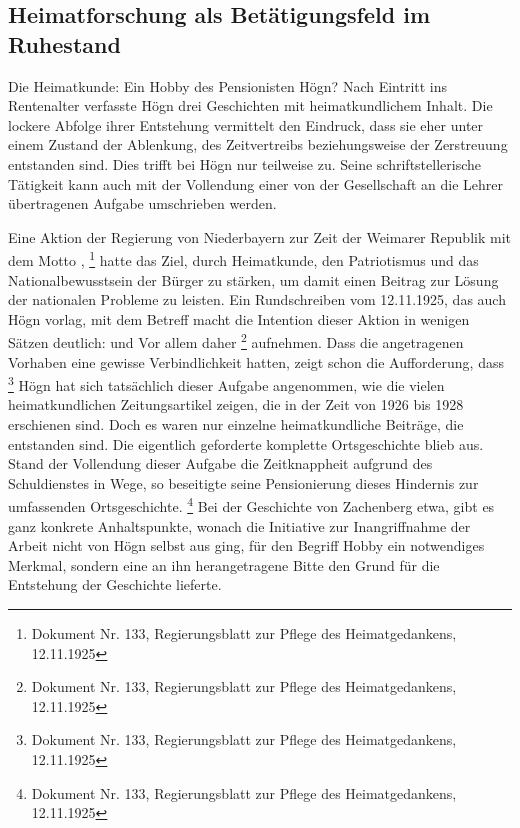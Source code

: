 \subsection{Heimatforschung als Betätigungsfeld im Ruhestand}

Die Heimatkunde: Ein Hobby des
Pensionisten Högn? Nach Eintritt ins Rentenalter verfasste Högn drei
Geschichten mit heimatkundlichem Inhalt. Die lockere Abfolge ihrer
Entstehung vermittelt den Eindruck, dass sie eher unter einem Zustand
der Ablenkung, des Zeitvertreibs beziehungsweise der Zerstreuung
entstanden sind. Dies trifft bei Högn nur teilweise zu. Seine
schriftstellerische Tätigkeit kann auch mit der Vollendung einer von
der Gesellschaft an die Lehrer übertragenen Aufgabe umschrieben werden.

Eine Aktion der Regierung von Niederbayern zur Zeit der Weimarer
Republik mit dem Motto , \footnote{Dokument Nr. 133, Regierungsblatt zur
Pflege des Heimatgedankens, 12.11.1925} hatte das Ziel, durch
Heimatkunde, den Patriotismus und das Nationalbewusstsein der Bürger zu
stärken, um damit einen Beitrag zur Lösung der nationalen Probleme zu
leisten. Ein Rundschreiben vom 12.11.1925, das auch Högn vorlag, mit
dem Betreff 
macht die Intention dieser Aktion in wenigen Sätzen deutlich:
 und
 Vor allem daher \footnote{Dokument Nr. 133, Regierungsblatt zur
Pflege des Heimatgedankens, 12.11.1925} aufnehmen. Dass die
angetragenen Vorhaben eine gewisse Verbindlichkeit hatten, zeigt schon
die Aufforderung, dass \footnote{
Dokument Nr. 133, Regierungsblatt zur Pflege des Heimatgedankens,
12.11.1925} Högn hat sich tatsächlich dieser Aufgabe angenommen, wie
die vielen heimatkundlichen Zeitungsartikel zeigen, die in der Zeit von
1926 bis 1928 erschienen sind. Doch es waren nur einzelne
heimatkundliche Beiträge, die entstanden sind. Die eigentlich
geforderte komplette Ortsgeschichte blieb aus. Stand der Vollendung
dieser Aufgabe die Zeitknappheit aufgrund des Schuldienstes in Wege, so
beseitigte seine Pensionierung dieses Hindernis zur umfassenden
Ortsgeschichte. \footnote{Dokument Nr. 133, Regierungsblatt zur Pflege
des Heimatgedankens, 12.11.1925} Bei der Geschichte von Zachenberg
etwa, gibt es ganz konkrete Anhaltspunkte, wonach die Initiative zur
Inangriffnahme der Arbeit nicht von Högn selbst aus ging, für den
Begriff Hobby ein notwendiges Merkmal, sondern eine an ihn
herangetragene Bitte den Grund für die Entstehung der Geschichte
lieferte.

